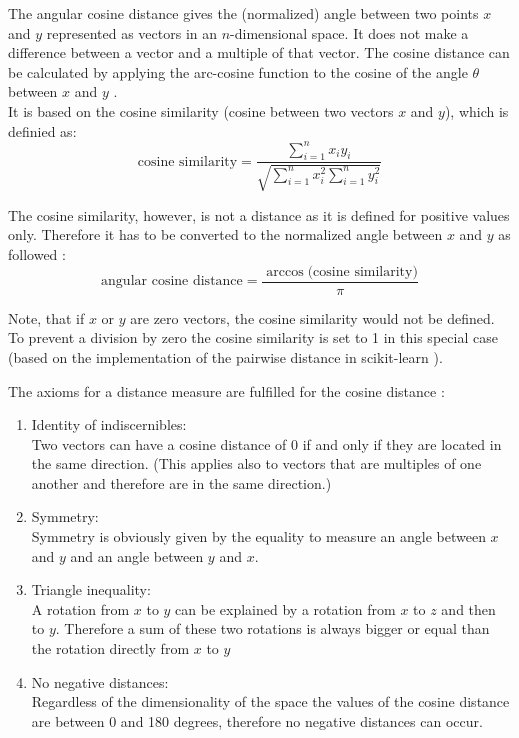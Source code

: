 
The angular cosine distance gives the (normalized) angle between two points $x$ and $y$ represented as vectors in an $n$-dimensional space. It does not make a difference between a vector and a multiple of that vector. The cosine distance can be calculated by applying the arc-cosine function to the cosine of the angle $\theta$ between $x$ and $y$ \cite{MMDS}. \\
It is based on the cosine similarity (cosine between two vectors $x$ and $y$), which is definied as: \\

\begin{equation}
	\text{cosine similarity} = \frac{\sum_{i=1}^{n} x_i y_i}{\sqrt{\sum_{i=1}^{n} x_i^2 \sum_{i=1}^{n} y_i^2}}
\end{equation}  

The cosine similarity, however, is not a distance as it is defined for positive values only. Therefore it has to be converted to the normalized angle between $x$ and $y$ as followed \cite{cosdist}: \\

\begin{equation}
	\text{angular cosine distance} = \frac{\arccos({\text{cosine similarity})}}{\pi}
\end{equation}  

Note, that if $x$ or $y$ are zero vectors, the cosine similarity would not be defined. To prevent a division by zero the cosine similarity is set to 1 in this special case (based on the implementation of the pairwise distance in scikit-learn \cite{scikitlearn}). 

The axioms for a distance measure are fulfilled for the cosine distance \cite{MMDS}: \\

\begin{enumerate}
	\item Identity of indiscernibles:\\
	Two vectors can have a cosine distance of 0 if and only if they are located in the same direction. (This applies also to vectors that are multiples of one another and therefore are in the same direction.) 
	\item Symmetry: \\
	Symmetry is obviously given by the equality to measure an angle between $x$ and $y$ and an angle between $y$ and $x$. 
	\item Triangle inequality: \\
	A rotation from $x$ to $y$ can be explained by a rotation from $x$ to $z$ and then to $y$. Therefore a sum of these two rotations is always bigger or equal than the rotation directly from $x$ to $y$ 
	\item No negative distances:\\
	Regardless of the dimensionality of the space the values of the cosine distance are between 0 and 180 degrees, therefore no negative distances can occur. 
	
\end{enumerate}

